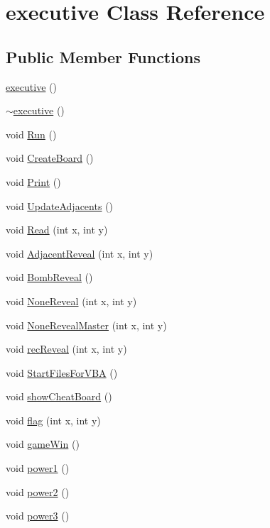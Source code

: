 \hypertarget{classexecutive}{}\section{executive Class Reference}
\label{classexecutive}
\subsection*{Public Member Functions}
\begin{DoxyCompactItemize}
\item 
\mbox{\hyperlink{classexecutive_af89b69f24d47db479a8fc99c1905ddda}{executive}} ()
\item 
\mbox{\hyperlink{classexecutive_a0d6dc7441c758d7c1fa3a375720e6952}{$\sim$executive}} ()
\item 
void \mbox{\hyperlink{classexecutive_a979d10f76a13e75a3d003fcbd7d224ad}{Run}} ()
\item 
void \mbox{\hyperlink{classexecutive_adccfcb025102490e13fd355d9c8bb3e8}{Create\+Board}} ()
\item 
void \mbox{\hyperlink{classexecutive_ae5e04159c4d86678485e4d788f302732}{Print}} ()
\item 
void \mbox{\hyperlink{classexecutive_a19c71fe2ec927ef624ef9dfb155fccc9}{Update\+Adjacents}} ()
\item 
void \mbox{\hyperlink{classexecutive_ab92cac9cdd28c568d079653c516c6a35}{Read}} (int x, int y)
\item 
void \mbox{\hyperlink{classexecutive_af6ca8c7e37912f612009a96a90113204}{Adjacent\+Reveal}} (int x, int y)
\item 
void \mbox{\hyperlink{classexecutive_a75c3e0d1420e409b8e955fc88d885b8b}{Bomb\+Reveal}} ()
\item 
void \mbox{\hyperlink{classexecutive_aff9907584bb8cf4840af71a283182b50}{None\+Reveal}} (int x, int y)
\item 
void \mbox{\hyperlink{classexecutive_a8fecd4b8d669dc584d9e7b4ba43c0eb7}{None\+Reveal\+Master}} (int x, int y)
\item 
void \mbox{\hyperlink{classexecutive_ad2c46b69f5f3592067d26e3dd7280616}{rec\+Reveal}} (int x, int y)
\item 
void \mbox{\hyperlink{classexecutive_a29514ae2f55a8f5f951566d1520ed5d8}{Start\+Files\+For\+V\+BA}} ()
\item 
void \mbox{\hyperlink{classexecutive_ad9c53131ff9fcb088ae6a46bb2874d90}{show\+Cheat\+Board}} ()
\item 
void \mbox{\hyperlink{classexecutive_a3f1b98d200affb24d1fefb92284d8841}{flag}} (int x, int y)
\item 
void \mbox{\hyperlink{classexecutive_adfb7dd27cc3b00120dc8500b3d54307b}{game\+Win}} ()
\item 
void \mbox{\hyperlink{classexecutive_a42eb5db1f682db14251d2887d862f075}{power1}} ()
\item 
void \mbox{\hyperlink{classexecutive_a35756c3d850f7a5661fdebc6f577984c}{power2}} ()
\item 
void \mbox{\hyperlink{classexecutive_a7fa257166eeb08882c3fa85a7005508c}{power3}} ()
\end{DoxyCompactItemize}


